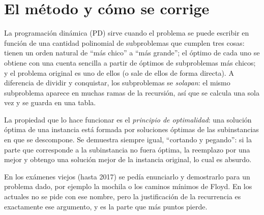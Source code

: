 
\newcommand{\pdalgo}[1]{\par\medskip\noindent{\sans\small\bfseries\color{acento}#1}\par\nopagebreak\smallskip}
\newcommand{\pdargmin}{\operatorname*{arg\,min}}
\newcommand{\pdargmax}{\operatorname*{arg\,max}}
\newcommand{\pdbar}[1]{\overline{#1}}


\section{El método y cómo se corrige}

La programación dinámica (PD) sirve cuando el problema se puede escribir en
función de una cantidad polinomial de subproblemas que cumplen tres cosas:
tienen un orden natural de ``más chico'' a ``más grande''; el óptimo de cada
uno se obtiene con una cuenta sencilla a partir de óptimos de subproblemas
más chicos; y el problema original es uno de ellos (o sale de ellos de forma
directa). A diferencia de dividir y conquistar, los subproblemas se
\emph{solapan}: el mismo subproblema aparece en muchas ramas de la recursión,
así que se calcula una sola vez y se guarda en una tabla.

La propiedad que lo hace funcionar es el \emph{principio de optimalidad}: una
solución óptima de una instancia está formada por soluciones óptimas de las
subinstancias en que se descompone. Se demuestra siempre igual, ``cortando y
pegando'': si la parte que corresponde a la subinstancia no fuera óptima, la
reemplazo por una mejor y obtengo una solución mejor de la instancia
original, lo cual es absurdo.

En los exámenes viejos (hasta 2017) se pedía enunciarlo y demostrarlo para
un problema dado, por ejemplo la mochila o los caminos mínimos de Floyd. En los
actuales no se pide con ese nombre, pero la justificación de la recurrencia
es exactamente ese argumento, y es la parte que más puntos pierde.

